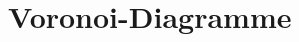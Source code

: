 \chapter{Voronoi-Diagramme}
\label{chap:voronoi}

\cite{Aurenhammer1991Voronoi}

\cite{Fortune1987, Dwyer1987} %
